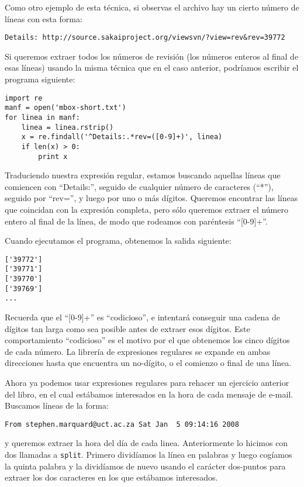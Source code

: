 Como otro ejemplo de esta técnica, si observas el archivo hay un cierto número de líneas
con esta forma:

\beforeverb
\begin{verbatim}
Details: http://source.sakaiproject.org/viewsvn/?view=rev&rev=39772
\end{verbatim}
\afterverb
%
Si queremos extraer todos los números de revisión (los números enteros al final de esas líneas)
usando la misma técnica que en el caso anterior, podríamos escribir el programa siguiente:

\beforeverb
\begin{verbatim}
import re
manf = open('mbox-short.txt')
for linea in manf:
    linea = linea.rstrip()
    x = re.findall('^Details:.*rev=([0-9]+)', linea)
    if len(x) > 0:
        print x
\end{verbatim}
\afterverb
%
Traduciendo nuestra expresión regular, estamos buscando aquellas líneas que comiencen con ``Details:'',
seguido de cualquier número de caracteres (``*''), seguido por ``rev='', y luego por uno o más dígitos.
Queremos encontrar las líneas que coincidan con la expresión completa, pero sólo queremos extraer
el número entero al final de la línea, de modo que rodeamos con paréntesis ``[0-9]+''.

Cuando ejecutamos el programa, obtenemos la salida siguiente:

\beforeverb
\begin{verbatim}
['39772']
['39771']
['39770']
['39769']
...
\end{verbatim}
\afterverb
%
Recuerda que el ``[0-9]+'' es ``codicioso'', e intentará conseguir una cadena de dígitos tan larga
como sea posible antes de extraer esos dígitos. Este comportamiento ``codicioso'' es el motivo por el que obtenemos
los cinco dígitos de cada número. La librería de expresiones regulares se expande en ambas direcciones hasta que
encuentra un no-dígito, o el comienzo o final de una línea.

Ahora ya podemos usar expresiones regulares para rehacer un ejercicio anterior del libro, en el cual estábamos
interesados en la hora de cada mensaje de e-mail. Buscamos líneas de la forma:

\beforeverb
\begin{verbatim}
From stephen.marquard@uct.ac.za Sat Jan  5 09:14:16 2008
\end{verbatim}
\afterverb
%
y queremos extraer la hora del día de cada linea. Anteriormente lo hicimos con dos llamadas a
{\tt split}. Primero dividíamos la línea en palabras y luego cogíamos la quinta palabra y la dividíamos
de nuevo usando el carácter dos-puntos para extraer los dos caracteres en los que estábamos interesados.

